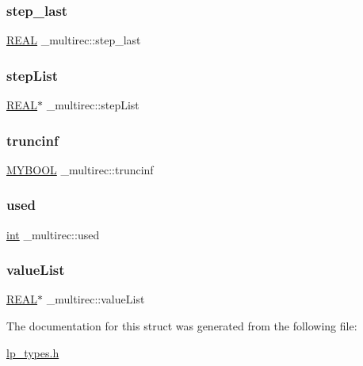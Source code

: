 \subsubsection{\texorpdfstring{step\+\_\+last}{step\_last}}
{\footnotesize\ttfamily \hyperlink{lp__lib_8h_a92bd5e363d131fa73669358edb232dce}{R\+E\+AL} \+\_\+multirec\+::step\+\_\+last}

\mbox{\label{struct__multirec_acfab83f282eaf3c22baa36b702b0abe6}} 
\subsubsection{\texorpdfstring{step\+List}{stepList}}
{\footnotesize\ttfamily \hyperlink{lp__lib_8h_a92bd5e363d131fa73669358edb232dce}{R\+E\+AL}$\ast$ \+\_\+multirec\+::step\+List}

\mbox{\label{struct__multirec_aedb8b59ccce2e60600b00b62cf064cea}} 
\subsubsection{\texorpdfstring{truncinf}{truncinf}}
{\footnotesize\ttfamily \hyperlink{lp__lib_8h_aad848328fb3018217ac9f01d97b6bd88}{M\+Y\+B\+O\+OL} \+\_\+multirec\+::truncinf}

\mbox{\label{struct__multirec_abbeea1bc98405121d3f00cf0f52b92a5}} 
\subsubsection{\texorpdfstring{used}{used}}
{\footnotesize\ttfamily \hyperlink{lp__lib_8h_adeb9ec6400320e4923ac9d836d509ddb}{int} \+\_\+multirec\+::used}

\mbox{\label{struct__multirec_a99ca2dad3defbc66f01d7e59b637eacb}} 
\subsubsection{\texorpdfstring{value\+List}{valueList}}
{\footnotesize\ttfamily \hyperlink{lp__lib_8h_a92bd5e363d131fa73669358edb232dce}{R\+E\+AL}$\ast$ \+\_\+multirec\+::value\+List}



The documentation for this struct was generated from the following file\+:\begin{DoxyCompactItemize}
\item 
\hyperlink{lp__types_8h}{lp\+\_\+types.\+h}\end{DoxyCompactItemize}
